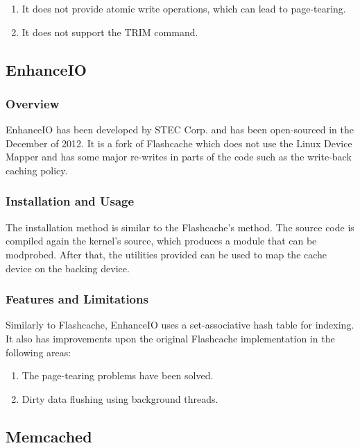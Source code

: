 \begin{enumerate}
	\item It does not provide atomic write operations, which can lead to 
		page-tearing.
	\item It does not support the TRΙΜ command.
\end{enumerate}

\subsection{EnhanceIO}

\subsubsection{Overview}

EnhanceIO has been developed by STEC Corp. and has been open-sourced in the 
December of 2012. It is a fork of Flashcache which does not use the Linux 
Device Mapper and has some major re-writes in parts of the code such as the 
write-back caching policy.

\subsubsection{Installation and Usage}

The installation method is similar to the Flashcache's method. The source code 
is compiled again the kernel's source, which produces a module that can be 
modprobed. After that, the utilities provided can be used to map the cache 
device on the backing device.

\subsubsection{Features and Limitations}

Similarly to Flashcache, EnhanceIO uses a set-associative hash table for 
indexing. It also has improvements upon the original Flashcache implementation 
in the following areas:

\begin{enumerate}
	\item The page-tearing problems have been solved.
	\item Dirty data flushing using background threads.
\end{enumerate}

\subsection{Memcached}\label{sec:memcached-triad}

